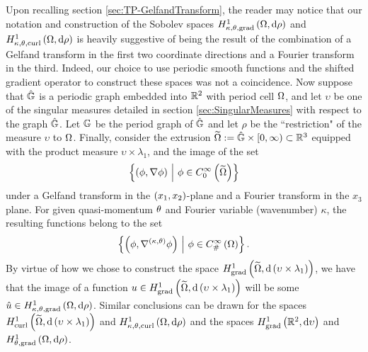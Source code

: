 Upon recalling section \ref{sec:TP-GelfandTransform}, the reader may notice that our notation and construction of the Sobolev spaces $H^1_{\kappa,\theta,\mathrm{grad}}\left( \Omega, \mathrm{d}\rho \right)$ and $H^1_{\kappa,\theta,\mathrm{curl}}\left( \Omega, \mathrm{d}\rho \right)$ is heavily suggestive of being the result of the combination of a Gelfand transform in the first two coordinate directions and a Fourier transform in the third.
Indeed, our choice to use periodic smooth functions and the shifted gradient operator to construct these spaces was not a coincidence.
Now suppose that $\hat{\mathbb{G}}$ is a periodic graph embedded into $\mathbb{R}^2$ with period cell $\Omega$, and let $\upsilon$ be one of the singular measures detailed in section \ref{sec:SingularMeasures} with respect to the graph $\hat{\mathbb{G}}$.
Let $\mathbb{G}$ be the period graph of $\hat{\mathbb{G}}$ and let $\rho$ be the ``restriction" of the measure $\upsilon$ to $\Omega$.
Finally, consider the extrusion $\widetilde{\Omega}:=\hat{\mathbb{G}}\times[0,\infty)\subset\mathbb{R}^3$ equipped with the product measure $\upsilon\times\lambda_1$, and the image of the set
\begin{align*}
	\left\{  \left( \phi, \nabla\phi \right) \ \middle\vert \  \phi\in C^{\infty}_{0}\left( \widetilde{\Omega} \right)  \right\}
\end{align*}
under a Gelfand transform in the $\left( x_1,x_2 \right)$-plane and a Fourier transform in the $x_3$ plane.
For given quasi-momentum $\theta$ and Fourier variable (wavenumber) $\kappa$, the resulting functions belong to the set
\begin{align*}
	\left\{  \left( \phi, \nabla^{\left( \kappa, \theta \right)}\phi \right) \ \middle\vert \  \phi\in C^{\infty}_{\#}\left( \Omega \right)  \right\}.
\end{align*}
By virtue of how we chose to construct the space $H^1_\mathrm{grad}\left( \widetilde{\Omega}, \mathrm{d}\left( \upsilon\times\lambda_1 \right) \right)$, we have that the image of a function $u\in H^1_\mathrm{grad}\left( \widetilde{\Omega}, \mathrm{d}\left( \upsilon\times\lambda_1 \right) \right)$ will be some $\hat{u}\in H^1_{\kappa,\theta,\mathrm{grad}}\left( \Omega, \mathrm{d}\rho \right)$.
Similar conclusions can be drawn for the spaces $H^1_\mathrm{curl}\left( \widetilde{\Omega}, \mathrm{d}\left( \upsilon\times\lambda_1 \right) \right)$ and $H^1_{\kappa,\theta,\mathrm{curl}}\left( \Omega, \mathrm{d}\rho \right)$ and the spaces $H^1_\mathrm{grad}\left( \mathbb{R}^2, \mathrm{d}\upsilon \right)$ and $H^1_{\theta, \mathrm{grad}}\left( \Omega, \mathrm{d}\rho \right)$.